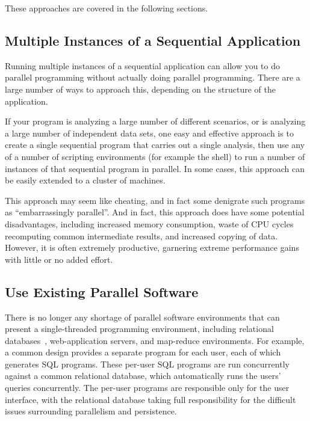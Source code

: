 These approaches are covered in the following sections.

\subsection{Multiple Instances of a Sequential Application}
\label{sec:intro:Multiple Instances of a Sequential Application}

Running multiple instances of a sequential application can allow you
to do parallel programming without actually doing parallel programming.
There are a large number of ways to approach this, depending on the
structure of the application.

If your program is analyzing a large number of different scenarios,
or is analyzing a large number of independent data sets, one easy
and effective approach is to create a single sequential program that
carries out a single analysis, then use any of a number of scripting
environments (for example the  shell) to run a number of
instances of that sequential program in parallel.
In some cases, this approach can be easily extended to a cluster of
machines.

This approach may seem like cheating, and in fact some denigrate such
programs as ``embarrassingly parallel''.
And in fact, this approach does have some potential disadvantages,
including increased memory consumption, waste of CPU cycles recomputing
common intermediate results, and increased copying of data.
However, it is often  extremely productive, garnering extreme performance
gains with little or no added effort.

\subsection{Use Existing Parallel Software}
\label{sec:intro:Use Existing Parallel Software}

There is no longer any shortage of parallel software environments that
can present a single-threaded programming environment,
including relational
databases~\cite{Date82},
web-application servers, and map-reduce environments.
For example, a common design provides a separate program for each
user, each of which generates SQL programs.
These per-user SQL programs are run concurrently against a common
relational database, which automatically runs the users' queries concurrently.
The per-user programs are responsible only for the user interface,
with the relational database taking full responsibility for the
difficult issues surrounding parallelism and persistence.

